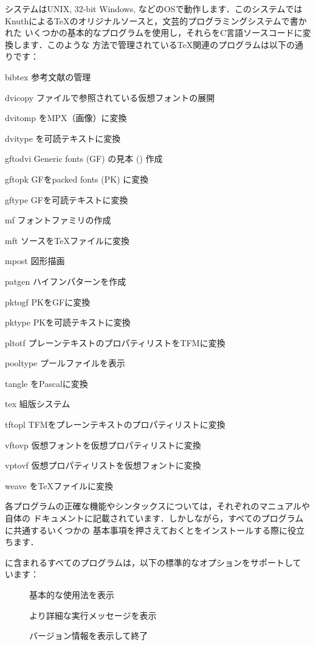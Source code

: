 \documentclass[uplatex,dvipdfmx]{jsarticle}
\begin{document}
\Webc システムはUNIX, 32-bit Windows, \macOS などのOSで動作します．このシステムでは
Knuthによる\TeX のオリジナルソースと，文芸的プログラミングシステム\WEB で書かれた
いくつかの基本的なプログラムを使用し，それらをC言語ソースコードに変換します．このような
方法で管理されている\TeX 関連のプログラムは以下の通りです：
%
\begin{cmddescription}
\item[bibtex] 参考文献の管理
\item[dvicopy] \DVI ファイルで参照されている仮想フォントの展開
\item[dvitomp] \DVI をMPX（\MP 画像）に変換
\item[dvitype] \DVI を可読テキストに変換
\item[gftodvi] Generic fonts (GF) の見本 (\DVI) 作成
\item[gftopk] GFをpacked fonts (PK) に変換
\item[gftype] GFを可読テキストに変換
\item[mf] フォントファミリの作成
\item[mft] \MF ソースを\TeX ファイルに変換
\item[mpost] 図形描画
\item[patgen] ハイフンパターンを作成
\item[pktogf] PKをGFに変換
\item[pktype] PKを可読テキストに変換
\item[pltotf] プレーンテキストのプロパティリストをTFMに変換
\item[pooltype] \WEB プールファイルを表示
\item[tangle] \WEB をPascalに変換
\item[tex] 組版システム
\item[tftopl] TFMをプレーンテキストのプロパティリストに変換
\item[vftovp] 仮想フォントを仮想プロパティリストに変換
\item[vptovf] 仮想プロパティリストを仮想フォントに変換
\item[weave] \WEB を\TeX ファイルに変換
\end{cmddescription}
%
各プログラムの正確な機能やシンタックスについては，それぞれのマニュアルや\Webc 自体の
ドキュメントに記載されています．しかしながら，すべてのプログラムに共通するいくつかの
基本事項を押さえておくと\Webc をインストールする際に役立ちます．

\Webc に含まれるすべてのプログラムは，以下の標準的な\GNU オプションをサポートして
います：
%
\begin{description}
\item[] 基本的な使用法を表示
\item[] より詳細な実行メッセージを表示
\item[] バージョン情報を表示して終了
\end{description}
\end{document}
